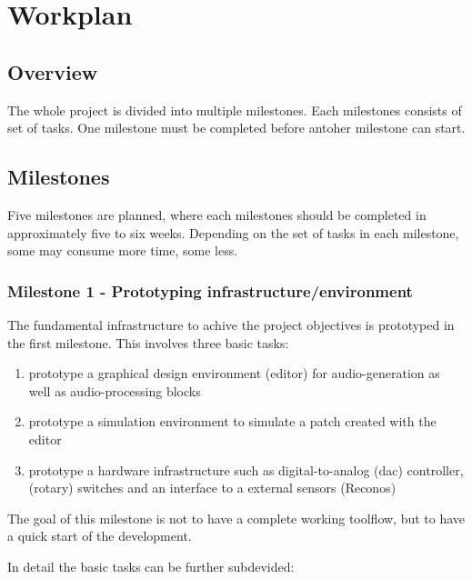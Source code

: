 \chapter{Workplan}

\section{Overview}

The whole project is divided into multiple milestones. Each milestones consists of set of tasks. One milestone must be completed before antoher milestone can start.

\section{Milestones}

Five milestones are planned, where each milestones should be completed in approximately five to six weeks. Depending on the set of tasks in each milestone, some may consume more time, some less.

\subsection{Milestone 1 - Prototyping infrastructure/environment}
The fundamental infrastructure to achive the project objectives is prototyped in the first milestone. This involves three basic tasks:

\begin{enumerate}
	\item prototype a graphical design environment (editor) for audio-generation as well as audio-processing blocks
	\item prototype a simulation environment to simulate a patch created with the editor
	\item prototype a hardware infrastructure such as digital-to-analog (dac) controller, (rotary) switches and an interface to a external sensors (Reconos)
\end{enumerate}
The goal of this milestone is not to have a complete working toolflow, but to have a quick start of the development.

In detail the basic tasks can be further subdevided:

